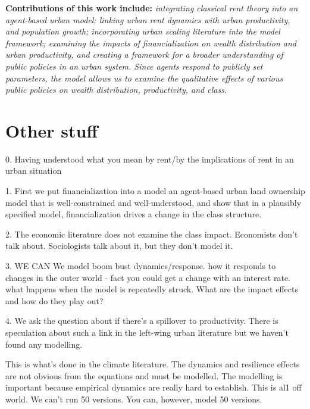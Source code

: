 \textbf{Contributions of this work include:} \textit{integrating classical rent theory into an agent-based urban model; linking urban rent dynamics with urban productivity, and population growth; incorporating urban scaling literature into the model framework; examining the impacts of financialization on wealth distribution and urban productivity, and creating a framework for a broader understanding of public policies in an urban system. Since agents respond to publicly set parameters, the model allows us to examine the qualitative effects of various public policies on wealth distribution, productivity, and class.}


\section{Other stuff}


0. Having understood what you mean by rent/by the implications of rent in an urban situation

1. First we put financialization into a model an agent-based urban land ownership model that is well-constrained and well-understood, and show that in a plausibly specified model, financialization drives a change in the class structure. 

2. The economic literature does not examine the class impact. Economists don't talk about. Sociologists talk about it, but they don't model it.

3. WE CAN We model boom bust dynamics/response. how it responds to changes in the outer world - fact you could get a change with an interest rate. what happens when the model is repeatedly struck. What are the impact effects and how do they play out?

4.  We ask the question about if there's a spillover to productivity. There is speculation about such a link in the left-wing urban literature but we haven't found any modelling.

This is what's done in the climate literature. The dynamics and resilience effects are not obvious from the equations and must be modelled. The modelling is important because empirical dynamics are really hard to establish. This is al1 off world. We can't run 50 versions. You can, however, model 50 versions. 

